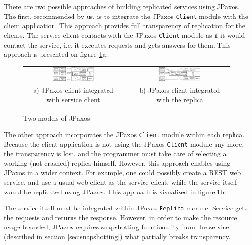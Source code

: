 There are two possible approaches of building replicated services using JPaxos.
The first, recommended by us, is to integrate the JPaxos \texttt{Client}
module with the client application.  This approach provides full transparency of
replication for the clients. The service client contacts with the JPaxos
\texttt{Client} module as if it would contact the service, i.e. it executes
requests and gets answers for them. This approach is presented on figure
\ref{fig:jpaxos_processes}a.

\begin{figure}[h]
 \begin{tabular}{ccc}
  \includegraphics[width=0.45\textwidth]{architecture/userArchitecture1.pdf}
  &
  \hspace{0.01\textwidth}
  &
  \includegraphics[width=0.45\textwidth]{architecture/userArchitecture2.pdf}
  \\ 
  \scriptsize a) JPaxos client integrated with service client
  & & 
  \scriptsize b) JPaxos client integrated with the replica\\
 \end{tabular}
 \caption{Two models of JPaxos}\label{fig:jpaxos_processes}
\end{figure}

The other approach incorporates the JPaxos \texttt{Client} module within
each replica. Because the client application is not using the JPaxos \texttt{Client}
module any more, the transparency is lost, and the programmer must
take care of selecting a working (not crashed) replica himself. However, this
approach enables using JPaxos in a wider context. For example, one could
possibly create a REST web service, and use a usual web client as the service
client, while the service itself would be replicated using JPaxos. This
approach is visualised in figure \ref{fig:jpaxos_processes}b.

The service itself must be integrated within JPaxos \texttt{Replica} module. Service gets the requests and returns the response. However, in order to make the resource usage bounded, JPaxos requires snapshotting functionality from the service (described in section \ref{sec:snapshotting})
what partially breaks transparency. 

